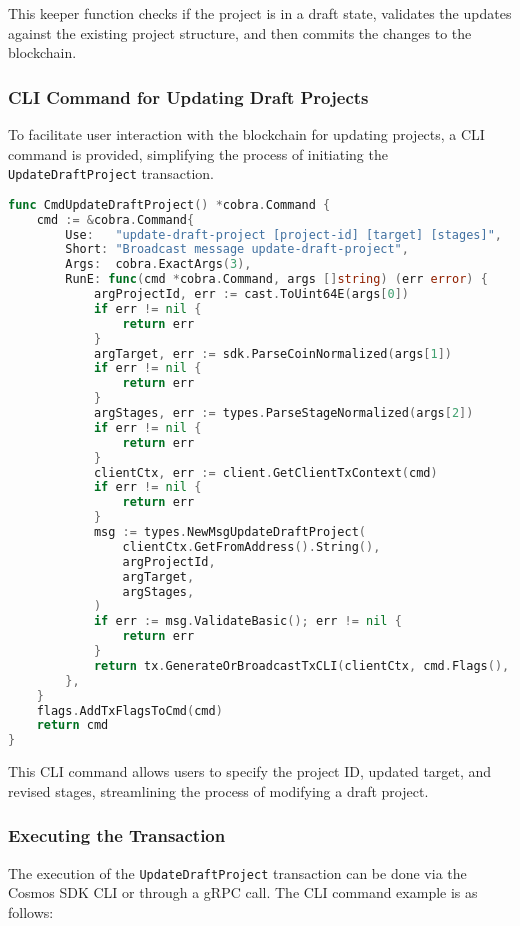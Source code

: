 This keeper function checks if the project is in a draft state, validates the updates against the existing project structure, and then commits the changes to the blockchain.

\subsubsection{CLI Command for Updating Draft Projects}
\label{subsubsec:cli-update-draft}

To facilitate user interaction with the blockchain for updating projects, a CLI command is provided, simplifying the process of initiating the \texttt{UpdateDraftProject} transaction.

\newpage
\begin{lstlisting}[language=go, caption=Create Project CLI definition, label={lst:update-draft-cli}]
func CmdUpdateDraftProject() *cobra.Command {
	cmd := &cobra.Command{
		Use:   "update-draft-project [project-id] [target] [stages]",
		Short: "Broadcast message update-draft-project",
		Args:  cobra.ExactArgs(3),
		RunE: func(cmd *cobra.Command, args []string) (err error) {
			argProjectId, err := cast.ToUint64E(args[0])
			if err != nil {
				return err
			}
			argTarget, err := sdk.ParseCoinNormalized(args[1])
			if err != nil {
				return err
			}
			argStages, err := types.ParseStageNormalized(args[2])
			if err != nil {
				return err
			}
			clientCtx, err := client.GetClientTxContext(cmd)
			if err != nil {
				return err
			}
			msg := types.NewMsgUpdateDraftProject(
				clientCtx.GetFromAddress().String(),
				argProjectId,
				argTarget,
				argStages,
			)
			if err := msg.ValidateBasic(); err != nil {
				return err
			}
			return tx.GenerateOrBroadcastTxCLI(clientCtx, cmd.Flags(), msg)
		},
	}
	flags.AddTxFlagsToCmd(cmd)
	return cmd
}
\end{lstlisting}

This CLI command allows users to specify the project ID, updated target, and revised stages, streamlining the process of modifying a draft project.

\subsubsection{Executing the Transaction}
\label{subsubsec:executing-update-draft}

The execution of the \texttt{UpdateDraftProject} transaction can be done via the Cosmos SDK CLI or through a gRPC call. The CLI command example is as follows:

